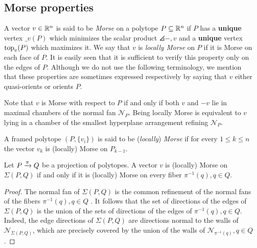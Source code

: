 
\subsection{Morse properties}



A vector $v \in \mathbb{R}^n$ is said to be \textit{Morse} on a polytope $P \subseteq \mathbb{R}^n$ if $P$ has a \textbf{unique} vertex $\bm_v(P)$ which minimizes the scalar product $\angles{-,v}$ and a \textbf{unique} vertex $\operatorname{top}_v(P)$ which maximizes it.
We say that $v$ is \textit{locally Morse} on $P$ if it is Morse on each face of $P$.
It is easily seen that it is sufficient to verify this property only on the edges of $P$.
Although we do not use the following terminology, we mention that these properties are sometimes expressed respectively by saying that $v$ either quasi-orients or orients $P$.

\begin{remark}
	Note that $v$ is Morse with respect to $P$ if and only if both $v$ and $-v$ lie in maximal chambers of the normal fan $\mathcal{N}_P$.
	Being locally Morse is equivalent to $v$ lying in a chamber of the smallest hyperplane arrangement refining $\mathcal{N}_P$.
\end{remark}



A framed polytope $(P, \{v_i\})$ is said to be (\textit{locally}) \textit{Morse} if for every $1 \leq k \leq n$ the vector $v_k$ is (locally) Morse on $P_{k-1}$.


\begin{lemma} 
\label{l:orients-the-fibers}
	Let $P \xrightarrow{\pi} Q$ be a projection of polytopes.
	A vector $v$ is (locally) Morse on $\Sigma(P, Q)$ if and only if it is (locally) Morse on every fiber $\pi^{-1}(q), q \in Q$.
\end{lemma}

\begin{proof}
	The normal fan of $\Sigma(P,Q)$ is the common refinement of the normal fans of the fibers $\pi^{-1}(q), q \in Q$ \cite[Proposition 2.2]{BilleraSturmfels94}.
	It follows that the set of directions of the edges of $\Sigma(P,Q)$ is the union of the sets of directions of the edges of $\pi^{-1}(q), q \in Q$.
	Indeed, the edge directions of $\Sigma(P,Q)$ are directions normal to the walls of $\mathcal{N}_{\Sigma(P,Q)}$, which are precisely covered by the union of the walls of $\mathcal{N}_{\pi^{-1}(q)}, q \in Q$.
\end{proof}



